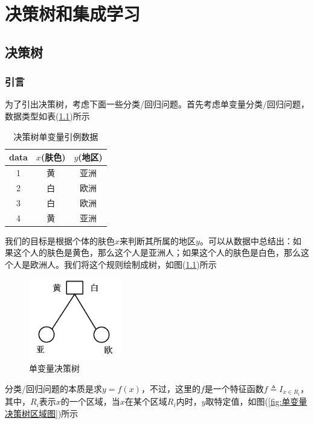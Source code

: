 \chapter{决策树和集成学习}
\section{决策树}
    \subsection{引言}
        \par
        为了引出决策树，考虑下面一些分类/回归问题。首先考虑单变量分类/回归问题，数据类型如表(\ref{决策树单变量引例数据})所示
        \begin{table}[H]
        \caption{决策树单变量引例数据}
        \label{决策树单变量引例数据}
        \centering
        \begin{tabular}{c|cc}
        \toprule
        data   & $x$(肤色)    & $y$(地区)   \\
        \midrule
        1      & 黄      & 亚洲   \\
        2      & 白      & 欧洲   \\
        3      & 白      & 欧洲   \\
        4      & 黄      & 亚洲   \\
        \bottomrule
        \end{tabular}
        \end{table}
        我们的目标是根据个体的肤色$x$来判断其所属的地区$y$。可以从数据中总结出：如果这个人的肤色是黄色，那么这个人是亚洲人；如果这个人的肤色是白色，那么这个人是欧洲人。我们将这个规则绘制成树，如图(\ref{fig:单变量决策树})所示
                \begin{figure}[H]
                \centering
                \includegraphics[width=4cm]{images/Univariate_tree.jpg}
                \caption{单变量决策树}
                \label{fig:单变量决策树}
                \end{figure}
        分类/回归问题的本质是求$y = f(x)$，不过，这里的$f$是一个特征函数$f \triangleq I_{x\in R_i}$，其中，$R_i$表示$x$的一个区域，当$x$在某个区域$R_i$内时，$y$取特定值，如图(\ref{fig:单变量决策树区域图})所示
